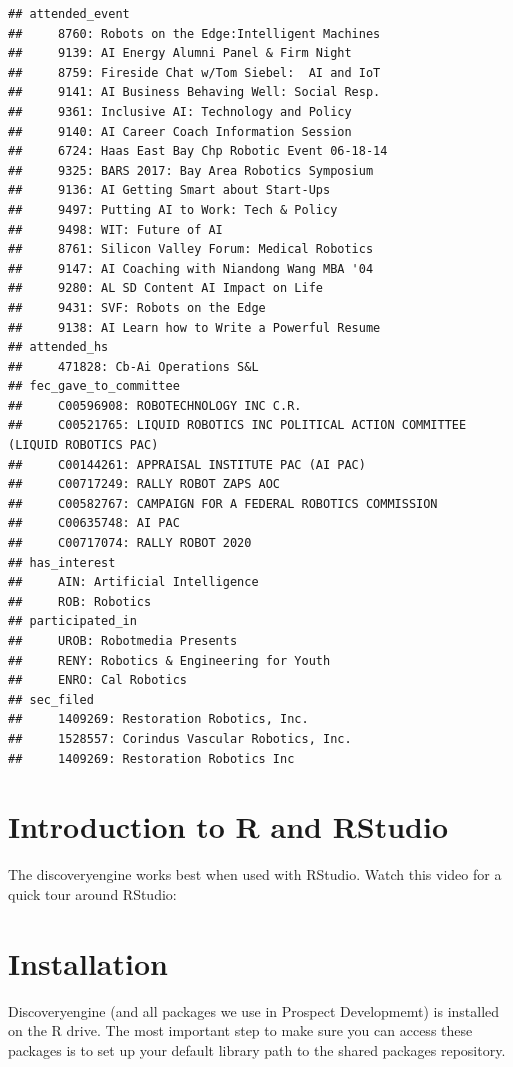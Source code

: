 \documentclass[]{book}
\begin{document}
\begin{verbatim}
## attended_event 
##     8760: Robots on the Edge:Intelligent Machines
##     9139: AI Energy Alumni Panel & Firm Night
##     8759: Fireside Chat w/Tom Siebel:  AI and IoT
##     9141: AI Business Behaving Well: Social Resp.
##     9361: Inclusive AI: Technology and Policy
##     9140: AI Career Coach Information Session
##     6724: Haas East Bay Chp Robotic Event 06-18-14
##     9325: BARS 2017: Bay Area Robotics Symposium
##     9136: AI Getting Smart about Start-Ups
##     9497: Putting AI to Work: Tech & Policy
##     9498: WIT: Future of AI
##     8761: Silicon Valley Forum: Medical Robotics
##     9147: AI Coaching with Niandong Wang MBA '04
##     9280: AL SD Content AI Impact on Life
##     9431: SVF: Robots on the Edge
##     9138: AI Learn how to Write a Powerful Resume
## attended_hs 
##     471828: Cb-Ai Operations S&L
## fec_gave_to_committee 
##     C00596908: ROBOTECHNOLOGY INC C.R.
##     C00521765: LIQUID ROBOTICS INC POLITICAL ACTION COMMITTEE (LIQUID ROBOTICS PAC)
##     C00144261: APPRAISAL INSTITUTE PAC (AI PAC)
##     C00717249: RALLY ROBOT ZAPS AOC
##     C00582767: CAMPAIGN FOR A FEDERAL ROBOTICS COMMISSION
##     C00635748: AI PAC
##     C00717074: RALLY ROBOT 2020
## has_interest 
##     AIN: Artificial Intelligence
##     ROB: Robotics
## participated_in 
##     UROB: Robotmedia Presents
##     RENY: Robotics & Engineering for Youth
##     ENRO: Cal Robotics
## sec_filed 
##     1409269: Restoration Robotics, Inc.
##     1528557: Corindus Vascular Robotics, Inc.
##     1409269: Restoration Robotics Inc
\end{verbatim}

\hypertarget{r-intro}{%
\chapter{Introduction to R and RStudio}\label{r-intro}}

The discoveryengine works best when used with RStudio. Watch this video for a quick tour around RStudio:

\hypertarget{installation}{%
\chapter{Installation}\label{installation}}

Discoveryengine (and all packages we use in Prospect Developmemt) is installed on the R drive. The most important step to make sure you can access these packages is to set up your default library path to the shared packages repository.
\end{document}
